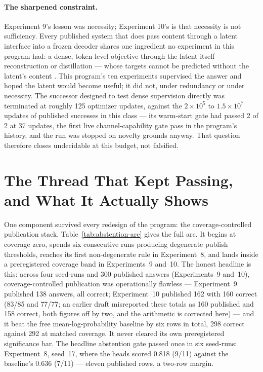 \documentclass[10pt,a4paper]{article}
\begin{document}
\paragraph{The sharpened constraint.}
Experiment 9's lesson was necessity; Experiment 10's is that necessity is not sufficiency. Every published system that does pass content through a latent interface into a frozen decoder shares one ingredient no experiment in this program had: a dense, token-level objective through the latent itself --- reconstruction or distillation --- whose targets cannot be predicted without the latent's content \cite{codi2025,coconut2024}. This program's ten experiments supervised the answer and hoped the latent would become useful; it did not, under redundancy or under necessity. The successor designed to test dense supervision directly was terminated at roughly 125 optimizer updates, against the $2\times10^{5}$ to $1.5\times10^{7}$ updates of published successes in this class --- its warm-start gate had passed 2 of 2 at 37 updates, the first live channel-capability gate pass in the program's history, and the run was stopped on novelty grounds anyway. That question therefore closes undecidable at this budget, not falsified.

\section{The Thread That Kept Passing, and What It Actually Shows}\label{sec:abstention}

One component survived every redesign of the program: the coverage-controlled
publication stack. Table~\ref{tab:abstention-arc} gives the full arc. It begins
at coverage zero, spends six consecutive runs producing degenerate publish
thresholds, reaches its first non-degenerate rule in Experiment~8, and lands
inside a preregistered coverage band in Experiments~9 and~10. The honest
headline is this: across four seed-runs and 300 published answers
(Experiments~9 and~10), coverage-controlled publication was operationally
flawless --- Experiment~9 published 138 answers, all correct; Experiment~10
published 162 with 160 correct (83/85 and 77/77; an earlier draft misreported
these totals as 160 published and 158 correct, both figures off by two, and the
arithmetic is corrected here) --- and it beat the free mean-log-probability
baseline by six rows in total, 298 correct against 292 at matched coverage. It
never cleared its own preregistered significance bar. The headline abstention
gate passed once in six seed-runs: Experiment~8, seed~17, where the heads
scored 0.818 (9/11) against the baseline's 0.636 (7/11) --- eleven published
rows, a two-row margin.
\end{document}
